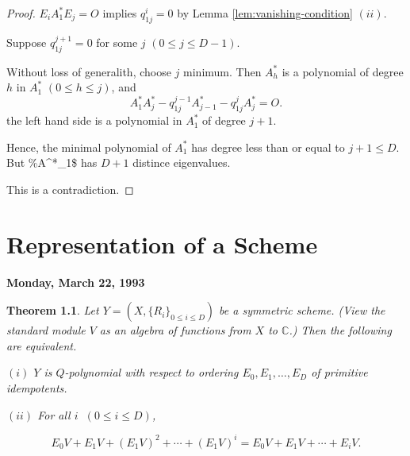 \documentclass[
]{book}
\newtheorem{theorem}{Theorem}[chapter]
\theoremstyle{definition}
\theoremstyle{definition}
\theoremstyle{definition}
\theoremstyle{definition}
\theoremstyle{remark}
\begin{document}
\begin{proof}
\(E_iA^*_1E_j = O\) implies \(q^i_{1j} = 0\) by Lemma \ref{lem:vanishing-condition} \((ii)\).

Suppose \(q^{j+1}_{1j} = 0\) for some \(j\) \((0\leq j\leq D-1)\).

Without loss of generalith, choose \(j\) minimum. Then
\(A^*_h\) is a polynomial of degree \(h\) in \(A^*_1\) \((0\leq h\leq j)\), and
\[A^*_1A^*_j - q^{j-1}_{1j}A^*_{j-1} - q^j_{1j}A^*_j = O.\]
the left hand side is a polynomial in \(A^*_1\) of degree \(j+1\).

Hence, the minimal polynomial of \(A^*_1\) has degree less than or equal to \(j+1 \leq D\). But \%A\^{}*\_1\$ has \(D+1\) distince eigenvalues.

This is a contradiction.

\end{proof}

\hypertarget{lec23}{%
\chapter{Representation of a Scheme}\label{lec23}}

\textbf{Monday, March 22, 1993}

\begin{theorem}
\protect\hypertarget{thm:q-polynomial-space}{}\label{thm:q-polynomial-space}Let \(Y = (X, \{R_i\}_{0\leq i\leq D})\) be a symmetric scheme. (View the standard module \(V\) as an algebra of functions from \(X\) to \(\mathbb{C}\).) Then the following are equivalent.

\((i)\) \(Y\) is \(Q\)-polynomial with respect to ordering \(E_0, E_1, \ldots, E_D\) of primitive idempotents.

\((ii)\) For all \(i\) \(\:(0\leq i\leq D)\),

\[E_0V + E_1V + (E_1V)^2 + \cdots + (E_1V)^i = E_0V + E_1V + \cdots + E_iV.\]
\end{theorem}
\end{document}
